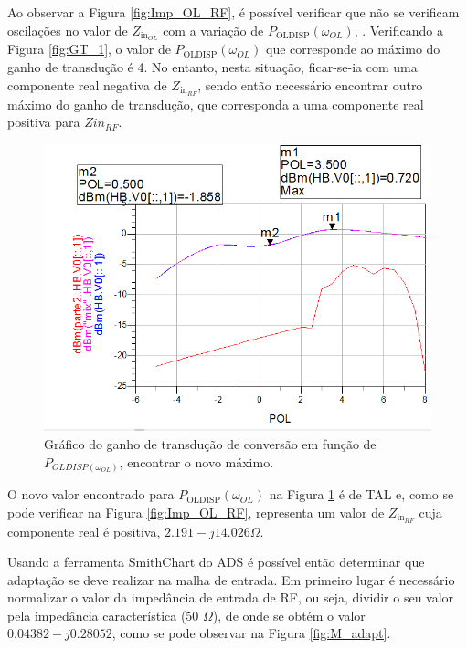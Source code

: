 \documentclass[11pt]{article}
\numberwithin{equation}{section}
\begin{document}
Ao observar a Figura \ref{fig:Imp_OL_RF}, é possível verificar que não se verificam oscilações no valor de $ Z_{\text{in}_{OL}} $ com a variação de $ P_{\text{OLDISP}}\left(\omega_{OL}\right) $, . Verificando a Figura \ref{fig:GT_1}, o valor de $ P_{\text{OLDISP}}\left(\omega_{OL}\right) $ que corresponde ao máximo do ganho de transdução é 4. No entanto, nesta situação, ficar-se-ia com uma componente real negativa de $ Z_{\text{in}_{RF}} $, sendo então necessário encontrar outro máximo do ganho de transdução, que corresponda a uma componente real positiva para $ Zin_{RF} $.

\begin{figure}[h]
\centering
\includegraphics[keepaspectratio=true, scale=0.45]{exps/GT_20}
\vspace{-0.5em}
\caption{Gráfico do ganho de transdução de conversão em função de $ P_{OLDISP(\omega_{OL})} $, encontrar o novo máximo.}
\vspace{-0.8em}
\label{fig:GT_20}
\end{figure}

O novo valor encontrado para $ P_{\text{OLDISP}}\left(\omega_{OL}\right) $ na Figura \ref{fig:GT_20} é de TAL e, como se pode verificar na Figura \ref{fig:Imp_OL_RF}, representa um valor de $ Z_{\text{in}_{RF}} $ cuja componente real é positiva, $ 2.191 -j14.026 \Omega $.

Usando a ferramenta SmithChart do ADS é possível então determinar que adaptação se deve realizar na malha de entrada. Em primeiro lugar é necessário normalizar o valor da impedância de entrada de RF, ou seja, dividir o seu valor pela impedância característica (50 $\Omega$), de onde se obtém o valor $0.04382 -j0.28052$, como se pode observar na Figura \ref{fig:M_adapt}.
\end{document}
